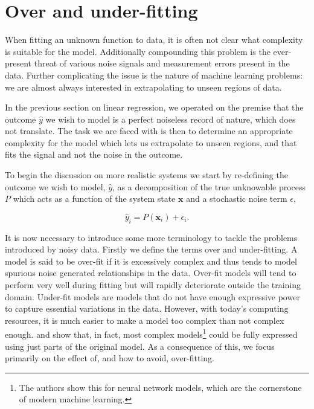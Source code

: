 \section{Over and under-fitting}\label{sec:fitting}

When fitting an unknown function to data, it is often not clear what complexity is suitable for the model. Additionally compounding this problem is the ever-present threat of various noise signals and measurement errors present in the data. Further complicating the issue is the nature of machine learning problems: we are almost always interested in extrapolating to unseen regions of data. 

In the previous section on linear regression, we operated on the premise that the outcome $\hat{y}$ we wish to model is a perfect noiseless record of nature, which does not translate. The task we are faced with is then to determine an appropriate complexity for the model which lets us extrapolate to unseen regions, and that fits the signal and not the noise in the outcome. 

To begin the discussion on more realistic systems we start by re-defining the outcome we wish to model, $\hat{y}$, as a decomposition of the true unknowable process $P$ which acts as a function of the system state $\boldsymbol{x}$ and a stochastic noise term $\epsilon$, 

\begin{equation}\label{eq:target}
\hat{y}_i = P(\boldsymbol{x}_i) + \epsilon_i.
\end{equation}

\noindent It is now necessary to introduce some more terminology to tackle the problems introduced by noisy data. Firstly we define the terms over and under-fitting. A model is said to be over-fit if it is excessively complex and thus tends to model spurious noise generated relationships in the data. Over-fit models will tend to perform very well during fitting but will rapidly deteriorate outside the training  domain. Under-fit models are models that do not have enough expressive power to capture essential variations in the data.  However, with today's computing resources, it is much easier to make a model too complex than not complex enough. \citet{Frankle2019} and \citet{Frankle2018} show that, in fact, most complex models\footnote{The authors show this for neural network models, which are the cornerstone of modern machine learning.} could be fully expressed using just parts of the original model. As a consequence of this, we focus primarily on the effect of, and how to avoid, over-fitting.


